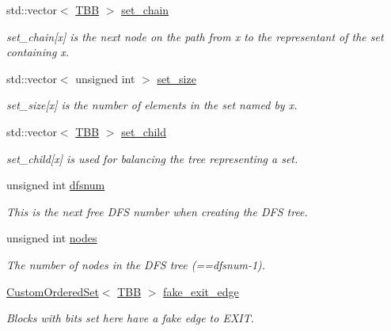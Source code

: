 \begin{DoxyCompactItemize}
std\+::vector$<$ \hyperlink{Dominance_8hpp_ac35ffd4ddeccae8225d6ec6f55d65a97}{T\+BB} $>$ \hyperlink{classdom__info_af1b668d5964ae434687fe63963b82715}{set\+\_\+chain}
\begin{DoxyCompactList}\small\item\em set\+\_\+chain\mbox{[}x\mbox{]} is the next node on the path from x to the representant of the set containing x. \end{DoxyCompactList}\item 
std\+::vector$<$ unsigned int $>$ \hyperlink{classdom__info_a50d0342534f943036b870dd2823bb351}{set\+\_\+size}
\begin{DoxyCompactList}\small\item\em set\+\_\+size\mbox{[}x\mbox{]} is the number of elements in the set named by x. \end{DoxyCompactList}\item 
std\+::vector$<$ \hyperlink{Dominance_8hpp_ac35ffd4ddeccae8225d6ec6f55d65a97}{T\+BB} $>$ \hyperlink{classdom__info_afebd5dc533d9c834e5eb3d0de38e3f6b}{set\+\_\+child}
\begin{DoxyCompactList}\small\item\em set\+\_\+child\mbox{[}x\mbox{]} is used for balancing the tree representing a set. \end{DoxyCompactList}\item 
unsigned int \hyperlink{classdom__info_afc75734433482656d0252c7faca9c67b}{dfsnum}
\begin{DoxyCompactList}\small\item\em This is the next free D\+FS number when creating the D\+FS tree. \end{DoxyCompactList}\item 
unsigned int \hyperlink{classdom__info_a48d909fc0cc96cb7c2f2f8c4bf766927}{nodes}
\begin{DoxyCompactList}\small\item\em The number of nodes in the D\+FS tree (==dfsnum-\/1). \end{DoxyCompactList}\item 
\hyperlink{classCustomOrderedSet}{Custom\+Ordered\+Set}$<$ \hyperlink{Dominance_8hpp_ac35ffd4ddeccae8225d6ec6f55d65a97}{T\+BB} $>$ \hyperlink{classdom__info_aa69999b48cf442d6bb20d295795e403c}{fake\+\_\+exit\+\_\+edge}
\begin{DoxyCompactList}\small\item\em Blocks with bits set here have a fake edge to E\+X\+IT. \end{DoxyCompactList}\item 

\end{DoxyCompactItemize}
